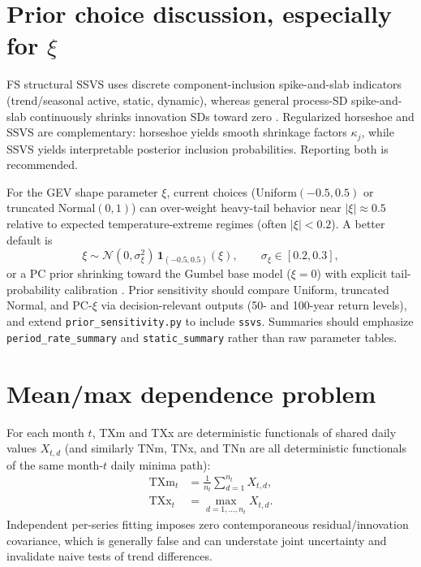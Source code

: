 \documentclass[11pt]{article}
\begin{document}
\section{Prior choice discussion, especially for $\xi$}
FS structural SSVS uses discrete component-inclusion spike-and-slab indicators (trend/seasonal active, static, dynamic), whereas general process-SD spike-and-slab continuously shrinks innovation SDs toward zero \cite{george1993,george1997}. Regularized horseshoe \cite{carvalho2010,piironen2017} and SSVS are complementary: horseshoe yields smooth shrinkage factors $\kappa_j$, while SSVS yields interpretable posterior inclusion probabilities. Reporting both is recommended.

For the GEV shape parameter $\xi$, current choices (Uniform$(-0.5,0.5)$ or truncated Normal$(0,1)$) can over-weight heavy-tail behavior near $|\xi|\approx 0.5$ relative to expected temperature-extreme regimes (often $|\xi|<0.2$). A better default is
\begin{equation}
\xi \sim \mathcal{N}(0,\sigma_\xi^2)\,\mathbf{1}_{(-0.5,0.5)}(\xi), \qquad \sigma_\xi \in [0.2,0.3],
\end{equation}
or a PC prior shrinking toward the Gumbel base model ($\xi=0$) with explicit tail-probability calibration \cite{simpson2017}. Prior sensitivity should compare Uniform, truncated Normal, and PC-$\xi$ via decision-relevant outputs (50- and 100-year return levels), and extend \texttt{prior\_sensitivity.py} to include \texttt{ssvs}. Summaries should emphasize \texttt{period\_rate\_summary} and \texttt{static\_summary} rather than raw parameter tables.

\section{Mean/max dependence problem}
For each month $t$, TXm and TXx are deterministic functionals of shared daily values $X_{t,d}$ (and similarly TNm, TNx, and TNn are all deterministic functionals of the same month-$t$ daily minima path):
\begin{align}
\mathrm{TXm}_t &= \frac{1}{n_t}\sum_{d=1}^{n_t}X_{t,d}, \\
\mathrm{TXx}_t &= \max_{d=1,\ldots,n_t} X_{t,d}.
\end{align}
Independent per-series fitting imposes zero contemporaneous residual/innovation covariance, which is generally false and can understate joint uncertainty and invalidate naive tests of trend differences.
\end{document}
